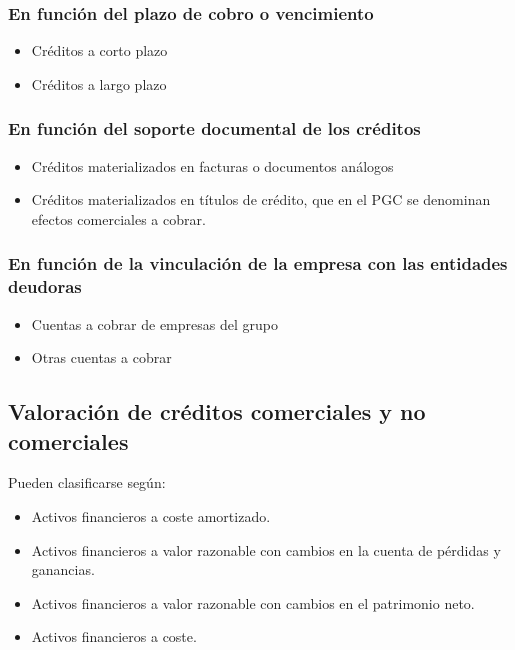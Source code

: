 \documentclass[a4paper,12pt]{article}
\begin{document}
\subsubsection{En función del plazo de cobro o vencimiento}

\begin{itemize}
    \item Créditos a corto plazo
    \item Créditos a largo plazo
\end{itemize}

\subsubsection{En función del soporte documental de los créditos}

\begin{itemize}
    \item Créditos materializados en facturas o documentos análogos
    \item Créditos materializados en títulos de crédito, que en el PGC se denominan efectos comerciales a cobrar.
\end{itemize}

\subsubsection{En función de la vinculación de la empresa con las entidades deudoras}

\begin{itemize}
    \item Cuentas a cobrar de empresas del grupo
    \item Otras cuentas a cobrar
\end{itemize}

\subsection{Valoración de créditos comerciales y no comerciales}

Pueden clasificarse según:
\begin{itemize}
    \item Activos financieros a coste amortizado.
    \item Activos financieros a valor razonable con cambios en la cuenta de pérdidas y ganancias.
    \item Activos financieros a valor razonable con cambios en el patrimonio neto.
    \item Activos financieros a coste.
\end{itemize}
\end{document}
